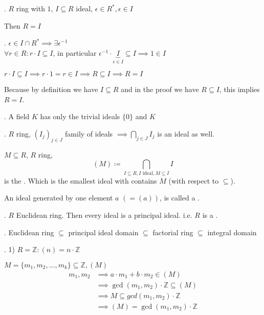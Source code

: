 \Theorem.
$R$ ring with $1$, $I \subseteq R$ ideal, $ \epsilon \in R^{*}, \epsilon \in I$

Then $R = I$

\Proof.
$\epsilon \in I \cap R^{*} \implies \exists \epsilon^{-1}$ \\
$\forall r \in R: r \cdot I \subseteq I$, in particular $\epsilon^{-1} \cdot \underbrace{I}_{\epsilon \in I} \subseteq I \implies 1 \in I$

$r \cdot I \subseteq I \implies r \cdot 1 = r \in I \implies R \subseteq I \implies R = I$

Because by definition we have $I \subseteq R$ and in the proof we have $R \subseteq I$, this implies $R = I$.

\Corollary.
A field $K$ has only the trivial ideals $\{0\}$ and $K$

\Remark.
$R$ ring, $(I_j)_{j\in J}$ family of ideals $\implies \bigcap_{j \in J} I_j$ is an ideal as well.

\begin{definition}
  $M \subseteq R$, $R$ ring,
  \[
    (M)\coloneqq \bigcap_{I \subseteq R, I \text{ ideal}, M \subseteq I} I
  \]
  is the . Which is the smallest ideal with contains $M$ (with respect to $\subseteq$).
\end{definition}

\begin{definition}
  An ideal generated by one element $a$ $\left( =(a) \right)$, is called a .
\end{definition}

\Theorem.
$R$ Euclidean ring. Then every ideal is a principal ideal.
i.e. $R$ is a .

\Remark.
Euclidean ring $\subseteq$ principal ideal domain $\subseteq$ factorial ring $\subseteq$ integral domain

\Example.
1) $R=\mathbb{Z}: (n) = n\cdot \mathbb{Z}$

$M = \{m_1, m_2, \ldots, m_k\} \subseteq \mathbb{Z}, (M)$\\
\begin{align*}
  m_1, m_2 &\implies a \cdot m_1 + b\cdot m_2 \in (M) \\
           &\implies \gcd(m_1,m_2) \cdot \mathbb{Z} \subseteq (M) \\
           &\implies M \subseteq gcd(m_1,m_2) \cdot \mathbb{Z} \\
           &\implies (M) = \gcd(m_1,m_2) \cdot \mathbb{Z}
\end{align*}

